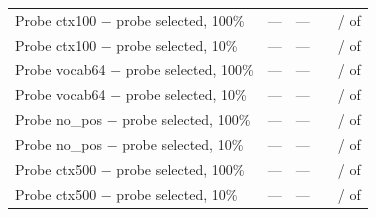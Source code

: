 \begin{tabular}{lcccc}
Probe ctx100 $-$ probe selected, 100\% & --- & --- & \transferValDiffMeanProbeCtxOneZeroZeroVsProbeFOneZeroZero{} & \transferValNBetterProbeCtxOneZeroZeroVsProbeFOneZeroZero{} / \transferValNWorseProbeCtxOneZeroZeroVsProbeFOneZeroZero{} of \transferValNComparedProbeCtxOneZeroZeroVsProbeFOneZeroZero{} \\
Probe ctx100 $-$ probe selected, 10\% & --- & --- & \transferValDiffMeanProbeCtxOneZeroZeroVsProbeFOneZero{} & \transferValNBetterProbeCtxOneZeroZeroVsProbeFOneZero{} / \transferValNWorseProbeCtxOneZeroZeroVsProbeFOneZero{} of \transferValNComparedProbeCtxOneZeroZeroVsProbeFOneZero{} \\
Probe vocab64 $-$ probe selected, 100\% & --- & --- & \transferValDiffMeanProbeVocabSixFourVsProbeFOneZeroZero{} & \transferValNBetterProbeVocabSixFourVsProbeFOneZeroZero{} / \transferValNWorseProbeVocabSixFourVsProbeFOneZeroZero{} of \transferValNComparedProbeVocabSixFourVsProbeFOneZeroZero{} \\
Probe vocab64 $-$ probe selected, 10\% & --- & --- & \transferValDiffMeanProbeVocabSixFourVsProbeFOneZero{} & \transferValNBetterProbeVocabSixFourVsProbeFOneZero{} / \transferValNWorseProbeVocabSixFourVsProbeFOneZero{} of \transferValNComparedProbeVocabSixFourVsProbeFOneZero{} \\
Probe no\_pos $-$ probe selected, 100\% & --- & --- & \transferValDiffMeanProbeNoPosVsProbeFOneZeroZero{} & \transferValNBetterProbeNoPosVsProbeFOneZeroZero{} / \transferValNWorseProbeNoPosVsProbeFOneZeroZero{} of \transferValNComparedProbeNoPosVsProbeFOneZeroZero{} \\
Probe no\_pos $-$ probe selected, 10\% & --- & --- & \transferValDiffMeanProbeNoPosVsProbeFOneZero{} & \transferValNBetterProbeNoPosVsProbeFOneZero{} / \transferValNWorseProbeNoPosVsProbeFOneZero{} of \transferValNComparedProbeNoPosVsProbeFOneZero{} \\
Probe ctx500 $-$ probe selected, 100\% & --- & --- & \transferValDiffMeanProbeCtxFiveZeroZeroVsProbeFOneZeroZero{} & \transferValNBetterProbeCtxFiveZeroZeroVsProbeFOneZeroZero{} / \transferValNWorseProbeCtxFiveZeroZeroVsProbeFOneZeroZero{} of \transferValNComparedProbeCtxFiveZeroZeroVsProbeFOneZeroZero{} \\
Probe ctx500 $-$ probe selected, 10\% & --- & --- & \transferValDiffMeanProbeCtxFiveZeroZeroVsProbeFOneZero{} & \transferValNBetterProbeCtxFiveZeroZeroVsProbeFOneZero{} / \transferValNWorseProbeCtxFiveZeroZeroVsProbeFOneZero{} of \transferValNComparedProbeCtxFiveZeroZeroVsProbeFOneZero{} \\
\bottomrule
\end{tabular}
